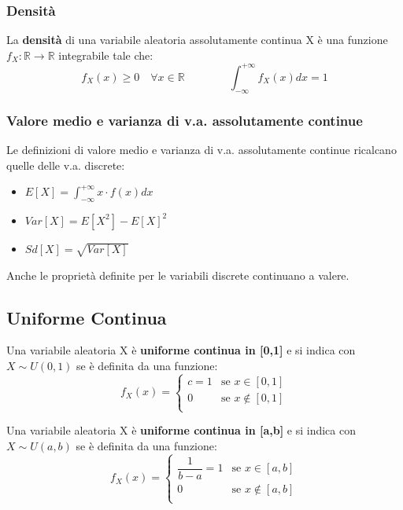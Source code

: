 \subsubsection{Densità}

La \textbf{densità} di una variabile aleatoria assolutamente continua X è una funzione $f_X: \mathbb{R} \xrightarrow{} \mathbb{R}$ integrabile tale che: $$ f_X(x) \geq 0 \quad \forall x \in \mathbb{R} \qquad \qquad \int_{-\infty}^{+\infty} f_X(x) dx = 1$$


\subsubsection{Valore medio e varianza di v.a. assolutamente continue}

Le definizioni di valore medio e varianza di v.a. assolutamente continue ricalcano quelle delle v.a. discrete:
\begin{itemize}
    \item $E[X] = \int_{-\infty}^{+\infty} x \cdot f(x) dx$
    \item $Var[X] = E[X^2] - E[X]^2$
    \item $Sd[X] = \sqrt{Var[X]}$
\end{itemize}
\noindent Anche le proprietà definite per le variabili discrete continuano a valere.

\subsection{Uniforme Continua}

Una variabile aleatoria X è \textbf{uniforme continua in [0,1]} e si indica con $X \sim U(0,1)$ se è definita da una funzione:
\begin{equation}
  f_X(x) =
    \begin{cases}
      c = 1& \text{se } x \in [0,1] \\
      0 & \text{se } x \not\in [0,1]\\
    \end{cases}       
\end{equation}

\noindent Una variabile aleatoria X è \textbf{uniforme continua in [a,b]} e si indica con $X \sim U(a,b)$ se è definita da una funzione:
\begin{equation}
  f_X(x) =
    \begin{cases}
      \dfrac{1}{b-a} = 1& \text{se } x \in [a,b] \\
      0 & \text{se } x \not\in [a,b]\\
    \end{cases}       
\end{equation}

